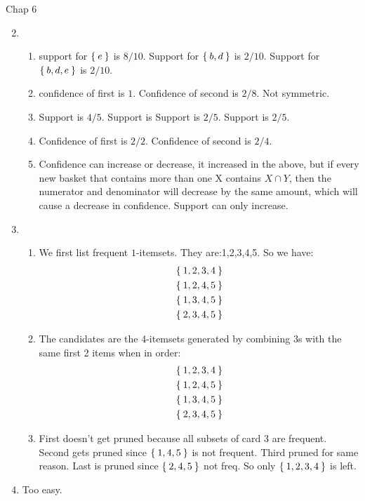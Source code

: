 \documentclass{amsbook}
\theoremstyle{plain}
\theoremstyle{definition}
\theoremstyle{remark}
\newcommand{\bee}{\begin{equation}\begin{aligned}}
\newcommand{\eee}{\end{aligned}\end{equation}}
\begin{document}
Chap 6
\begin{enumerate}
\setcounter{enumi}{1}

\item 
\begin{enumerate}
\item support for $\Set{e}$ is $8/10$. Support for $\Set{b,d}$ is $2/10$. Support for $\Set{b,d,e}$ is $2/10$. 

\item confidence of first is $1$. Confidence of second is $2/8$. Not symmetric. 

\item Support is $4/5$. Support is Support is $2/5$. Support is $2/5$. 

\item Confidence of first is $2/2$. Confidence of second is $2/4$. 

\item Confidence can increase or decrease, it increased in the above, but if every new basket that contains more than one X contains $X \cap Y$, then the numerator and denominator will decrease by the same amount, which will cause a decrease in confidence. Support can only increase. 
\end{enumerate}

\setcounter{enumi}{6}

\item 

\begin{enumerate}
\item We first list frequent $1$-itemsets. They are:1,2,3,4,5. So we have:
\bee
\Set{1,2,3,4}\\
\Set{1,2,4,5}\\
\Set{1,3,4,5}\\
\Set{2,3,4,5}\\
\eee

\item The candidates are the 4-itemsets generated by combining 3s with the same first 2 items when in order:
\bee
\Set{1,2,3,4}\\
\Set{1,2,4,5}\\
\Set{1,3,4,5}\\
\Set{2,3,4,5}\\
\eee

\item First doesn't get pruned because all subsets of card 3 are frequent. Second gets pruned since $\Set{1,4,5}$ is not frequent. Third pruned for same reason. Last is pruned since $\Set{2,4,5}$ not freq. So only $\Set{1,2,3,4}$ is left. 
\end{enumerate}
\item Too easy. 


\end{enumerate}









\appendix
%

\backmatter





\printindex
\end{document}
